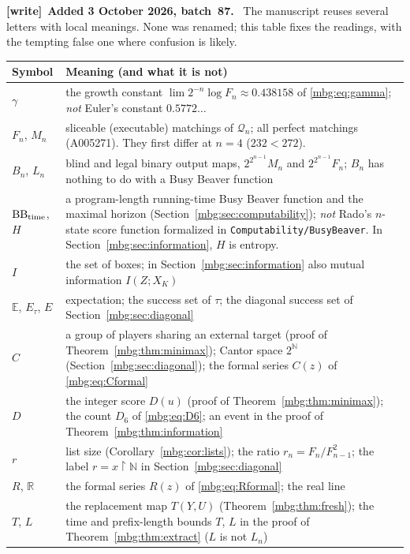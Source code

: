 \documentclass[11pt,letterpaper]{article}
\theoremstyle{definition}
\newcommand{\N}{\mathbb N}
\newcommand{\R}{\mathbb R}
\newcommand{\E}{\mathbb E}
\newcommand{\restr}{\mathbin{\upharpoonright}}
\newenvironment{writenote}[1][]{\par\smallskip\begingroup\small
 \noindent\textbf{[write]}\if\relax\detokenize{#1}\relax\else~\textbf{#1.}\fi\ }%
 {\par\endgroup\smallskip}
\begin{document}
\begin{writenote}[Added 3 October 2026, batch~87]
The manuscript reuses several letters with local meanings. None was renamed; this table fixes the readings, with the tempting false one where confusion is likely.
\begin{center}\small
\begin{tabular}{>{\raggedright\arraybackslash}p{}>{\raggedright\arraybackslash}p{}}
\toprule
Symbol & Meaning (and what it is not)\\
\midrule
$\gamma$ & the growth constant $\lim 2^{-n}\log F_n\approx0.438158$ of \eqref{mbg:eq:gamma}; \emph{not} Euler's constant $0.5772\ldots$\\
$F_n$, $M_n$ & sliceable (executable) matchings of $\mathcal Q_n$; all perfect matchings (A005271). They first differ at $n=4$ ($232<272$).\\
$B_n$, $L_n$ & blind and legal binary output maps, $2^{2^{n-1}}M_n$ and $2^{2^{n-1}}F_n$; $B_n$ has nothing to do with a Busy Beaver function\\
$\operatorname{BB}_{\rm time}$, $H$ & a program-length running-time Busy Beaver function and the maximal horizon (Section~\ref{mbg:sec:computability}); \emph{not} Rado's $n$-state score function formalized in \nolinkurl{Computability/BusyBeaver}. In Section~\ref{mbg:sec:information}, $H$ is entropy.\\
$I$ & the set of boxes; in Section~\ref{mbg:sec:information} also mutual information $I(Z;X_K)$\\
$\E$, $E_\tau$, $E$ & expectation; the success set of $\tau$; the diagonal success set of Section~\ref{mbg:sec:diagonal}\\
$C$ & a group of players sharing an external target (proof of Theorem~\ref{mbg:thm:minimax}); Cantor space $2^\N$ (Section~\ref{mbg:sec:diagonal}); the formal series $C(z)$ of \eqref{mbg:eq:Cformal}\\
$D$ & the integer score $D(u)$ (proof of Theorem~\ref{mbg:thm:minimax}); the count $D_6$ of \eqref{mbg:eq:D6}; an event in the proof of Theorem~\ref{mbg:thm:information}\\
$r$ & list size (Corollary~\ref{mbg:cor:lists}); the ratio $r_n=F_n/F_{n-1}^2$; the label $r=x\restr\N$ in Section~\ref{mbg:sec:diagonal}\\
$R$, $\R$ & the formal series $R(z)$ of \eqref{mbg:eq:Rformal}; the real line\\
$T$, $L$ & the replacement map $T(Y,U)$ (Theorem~\ref{mbg:thm:fresh}); the time and prefix-length bounds $T$, $L$ in the proof of Theorem~\ref{mbg:thm:extract} ($L$ is not $L_n$)\\

\end{tabular}
\end{center}
\end{writenote}
\end{document}
